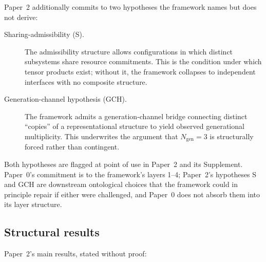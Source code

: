 \documentclass[11pt]{article}
\begin{document}
\noindent Paper~2 additionally commits to two hypotheses the framework names but does not derive:

\begin{description}
    \item[Sharing-admissibility (S).] The admissibility structure allows configurations in which distinct subsystems share resource commitments. This is the condition under which tensor products exist; without it, the framework collapses to independent interfaces with no composite structure.
    \item[Generation-channel hypothesis (GCH).] The framework admits a generation-channel bridge connecting distinct ``copies'' of a representational structure to yield observed generational multiplicity. This underwrites the argument that $N_{\mathrm{gen}} = 3$ is structurally forced rather than contingent.
\end{description}

\noindent Both hypotheses are flagged at point of use in Paper~2 and its Supplement. Paper~0's commitment is to the framework's layers 1--4; Paper~2's hypotheses S and GCH are downstream ontological choices that the framework could in principle repair if either were challenged, and Paper~0 does not absorb them into its layer structure.

\subsection{Structural results}\label{sec:P2_results}

Paper~2's main results, stated without proof:
\end{document}
